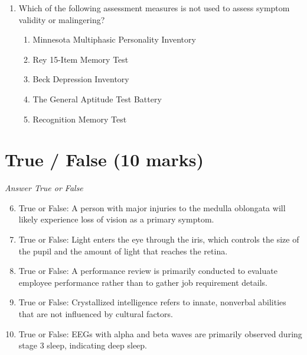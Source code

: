 \documentclass[12pt]{article}
\begin{document}
\begin{enumerate}[label=\arabic*.]
\begin{enumerate}[label=(\alph*)]
    \item aggressive acts can only be predicted by physical characteristics
    \item feelings of anonymity lead to more uncharacteristic violence
    \item aggressive acts increase the likelihood of further aggression
    \item frustration is a prerequisite for any aggressive act
    \item catharsis theory states that high stress levels lead to more aggression
\end{enumerate}
\item Which of the following assessment measures is not used to assess symptom validity or malingering?
\begin{enumerate}[label=(\alph*)]
    \item Minnesota Multiphasic Personality Inventory
    \item Rey 15-Item Memory Test
    \item Beck Depression Inventory
    \item The General Aptitude Test Battery
    \item Recognition Memory Test
\end{enumerate}
\end{enumerate}

\section*{True / False (10 marks)}
\textit{Answer True or False}
\begin{enumerate}[label=\arabic*.]
\setcounter{enumi}{5}
\item True or False: A person with major injuries to the medulla oblongata will likely experience loss of vision as a primary symptom.
\item True or False: Light enters the eye through the iris, which controls the size of the pupil and the amount of light that reaches the retina.
\item True or False: A performance review is primarily conducted to evaluate employee performance rather than to gather job requirement details.
\item True or False: Crystallized intelligence refers to innate, nonverbal abilities that are not influenced by cultural factors.
\item True or False: EEGs with alpha and beta waves are primarily observed during stage 3 sleep, indicating deep sleep.
\end{enumerate}
\end{document}
